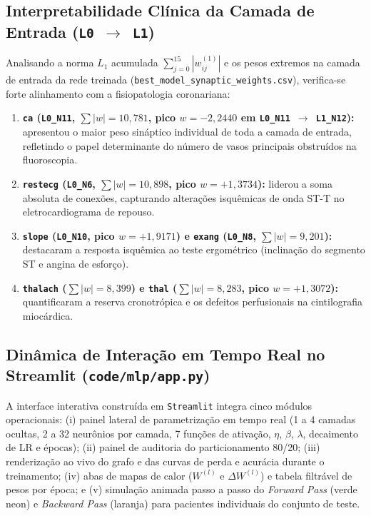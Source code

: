 \subsection{Interpretabilidade Clínica da Camada de Entrada (\texttt{L0 $\to$ L1})}
Analisando a norma $L_1$ acumulada $\sum_{j=0}^{15} |w_{ij}^{(1)}|$ e os pesos extremos na camada de entrada da rede treinada (\texttt{best\_model\_synaptic\_weights.csv}), verifica-se forte alinhamento com a fisiopatologia coronariana:
\begin{enumerate}
    \item \textbf{\texttt{ca} (\texttt{L0\_N11}, $\sum |w| = 10{,}781$, pico $w = -2{,}2440$ em \texttt{L0\_N11 $\to$ L1\_N12}):} apresentou o maior peso sináptico individual de toda a camada de entrada, refletindo o papel determinante do número de vasos principais obstruídos na fluoroscopia.
    \item \textbf{\texttt{restecg} (\texttt{L0\_N6}, $\sum |w| = 10{,}898$, pico $w = +1{,}3734$):} liderou a soma absoluta de conexões, capturando alterações isquêmicas de onda ST-T no eletrocardiograma de repouso.
    \item \textbf{\texttt{slope} (\texttt{L0\_N10}, pico $w = +1{,}9171$) e \texttt{exang} (\texttt{L0\_N8}, $\sum |w| = 9{,}201$):} destacaram a resposta isquêmica ao teste ergométrico (inclinação do segmento ST e angina de esforço).
    \item \textbf{\texttt{thalach} ($\sum |w| = 8{,}399$) e \texttt{thal} ($\sum |w| = 8{,}283$, pico $w = +1{,}3072$):} quantificaram a reserva cronotrópica e os defeitos perfusionais na cintilografia miocárdica.
\end{enumerate}

\subsection{Dinâmica de Interação em Tempo Real no Streamlit (\texttt{code/mlp/app.py})}
A interface interativa construída em \texttt{Streamlit} integra cinco módulos operacionais: (i) painel lateral de parametrização em tempo real (1 a 4 camadas ocultas, 2 a 32 neurônios por camada, 7 funções de ativação, $\eta$, $\beta$, $\lambda$, decaimento de LR e épocas); (ii) painel de auditoria do particionamento 80/20; (iii) renderização ao vivo do grafo e das curvas de perda e acurácia durante o treinamento; (iv) abas de mapas de calor ($W^{(l)}$ e $\Delta W^{(l)}$) e tabela filtrável de pesos por época; e (v) simulação animada passo a passo do \textit{Forward Pass} (verde neon) e \textit{Backward Pass} (laranja) para pacientes individuais do conjunto de teste.
